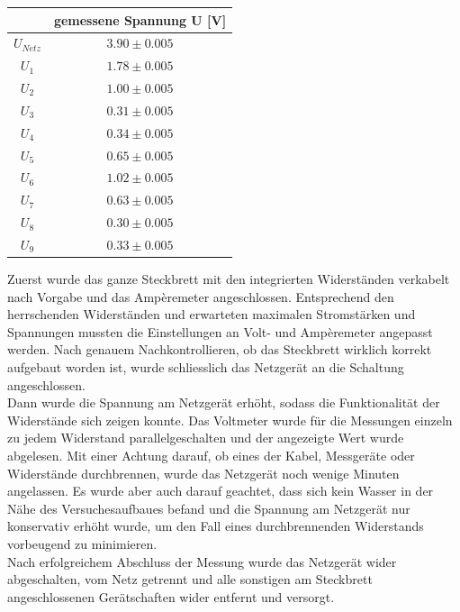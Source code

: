 \documentclass[a4paper,12pt]{article}
\begin{document}
\begin{table}[H]
    \centering
    \begin{tabular}{|c|c|}
        \hline
         & \textbf{gemessene Spannung U [V]}\\
        \hline
        $U_{Netz}$ & $3.90\pm 0.005$\\
        \hline
        $U_1$ & $1.78\pm 0.005$\\
        \hline
        $U_2$ & $1.00\pm 0.005$\\
        \hline
        $U_3$ & $0.31\pm 0.005$\\
        \hline
        $U_4$ & $0.34\pm 0.005$\\
        \hline
        $U_5$ & $0.65\pm 0.005$\\
        \hline
        $U_6$ & $1.02\pm 0.005$\\
        \hline
        $U_7$ & $0.63\pm 0.005$\\
        \hline
        $U_8$ & $0.30\pm 0.005$\\
        \hline
        $U_9$ & $0.33\pm 0.005$\\
        \hline
    \end{tabular}
\end{table}

Zuerst wurde das ganze Steckbrett mit den integrierten Widerständen verkabelt nach Vorgabe und das Ampèremeter angeschlossen. Entsprechend den herrschenden Widerständen und erwarteten maximalen Stromstärken und Spannungen mussten die Einstellungen an Volt- und Ampèremeter angepasst werden. Nach genauem Nachkontrollieren, ob das Steckbrett wirklich korrekt aufgebaut worden ist, wurde schliesslich das Netzgerät an die Schaltung angeschlossen. \\

Dann wurde die Spannung am Netzgerät erhöht, sodass die Funktionalität der Widerstände sich zeigen konnte. Das Voltmeter wurde für die Messungen einzeln zu jedem Widerstand parallelgeschalten und der angezeigte Wert wurde abgelesen. Mit einer Achtung darauf, ob eines der Kabel, Messgeräte oder Widerstände durchbrennen, wurde das Netzgerät noch wenige Minuten angelassen. Es wurde aber auch darauf geachtet, dass sich kein Wasser in der Nähe des Versuchesaufbaues befand und die Spannung am Netzgerät nur konservativ erhöht wurde, um den Fall eines durchbrennenden Widerstands vorbeugend zu minimieren.\\

Nach erfolgreichem Abschluss der Messung wurde das Netzgerät wider abgeschalten, vom Netz getrennt und alle sonstigen am Steckbrett angeschlossenen Gerätschaften wider entfernt und versorgt.
\end{document}
